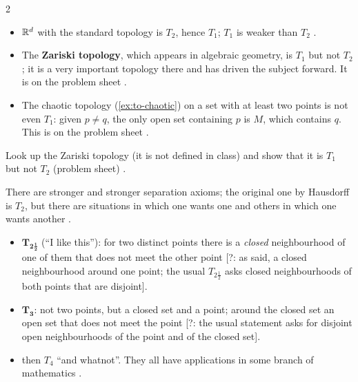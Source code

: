 \begin{paracol}{2}
\begin{example}\label{ex:iv-T}
\begin{itemize}
  \item $\mathbb{R}^d$ with the standard topology is $T_2$, hence $T_1$; $T_1$ is weaker than $T_2$ .
  \item The \textbf{Zariski topology}, which appears in algebraic geometry, is $T_1$ but not $T_2$; it is a very important topology there
        and has driven the subject forward. It is on the problem sheet .
  \item The chaotic topology (\cref{ex:to-chaotic}) on a set with at least two points is not even $T_1$: given $p\ne q$, the only open set containing
        $p$ is $M$, which contains $q$. This is on the problem sheet .
\end{itemize}
\end{example}
\begin{exercise}[Zariski]\label{ex:iv-zariski}
Look up the Zariski topology (it is not defined in class) and show that it is $T_1$ but not $T_2$ (problem sheet) .
\end{exercise}

\begin{remark}\label{rem:iv-sep}
There are stronger and stronger separation axioms; the original one by Hausdorff is $T_2$, but there are situations in which one wants one and
others in which one wants another .
\begin{itemize}
  \item $\mathbf{T_{2\frac12}}$ (``I like this''): for two distinct points there is a \emph{closed} neighbourhood of one of them that does not
        meet the other point  [?: as said, a closed neighbourhood around one point; the usual $T_{2\frac12}$ asks closed
        neighbourhoods of both points that are disjoint].
  \item $\mathbf{T_3}$: not two points, but a closed set and a point; around the closed set an open set that does not meet the point
         [?: the usual statement asks for disjoint open neighbourhoods of the point and of the closed set].
  \item then $T_4$ ``and whatnot''. They all have applications in some branch of mathematics .
\end{itemize}
\end{remark}


\end{paracol}
